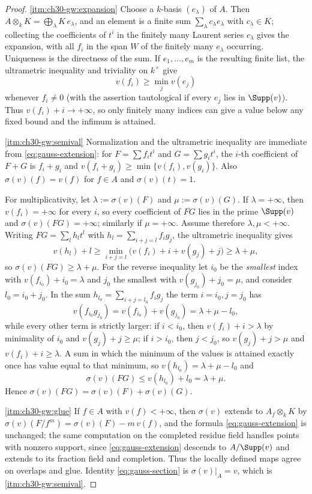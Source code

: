 \begin{proof}
\cref{itm:ch30-gw:expansion}  Choose a $k$-basis $(e_\lambda)$ of $A$.
Then $A\otimes_kK=\bigoplus_\lambda K\,e_\lambda$, and an element is a
finite sum $\sum_\lambda c_\lambda e_\lambda$ with
$c_\lambda\in K$; collecting the coefficients of $t^i$ in the finitely
many Laurent series $c_\lambda$ gives the expansion, with all $f_i$ in
the span $W$ of the finitely many $e_\lambda$ occurring.  Uniqueness is
the directness of the sum.  If $e_1,\ldots,e_m$ is the resulting finite
list, the ultrametric inequality and triviality on $k^\times$ give
\[
 v(f_i)\geq \min_jv(e_j)
\]
whenever $f_i\neq0$ (with the assertion tautological if every $e_j$ lies
in $\Supp(v)$).  Thus $v(f_i)+i\to+\infty$, so only finitely many indices
can give a value below any fixed bound and the infimum is attained.

\cref{itm:ch30-gw:semival}  Normalization and the ultrametric inequality are
immediate from \eqref{eq:gauss-extension}: for $F=\sum f_it^i$ and
$G=\sum g_it^i$, the $i$-th coefficient of $F+G$ is $f_i+g_i$ and
$v(f_i+g_i)\geq\min\{v(f_i),v(g_i)\}$.  Also
$\sigma(v)(f)=v(f)$ for $f\in A$ and $\sigma(v)(t)=1$.

For multiplicativity, let $\lambda:=\sigma(v)(F)$ and
$\mu:=\sigma(v)(G)$.  If $\lambda=+\infty$, then $v(f_i)=+\infty$ for
every $i$, so every coefficient of $FG$ lies in the prime
$\Supp(v)$ and $\sigma(v)(FG)=+\infty$; similarly if
$\mu=+\infty$.  Assume therefore $\lambda,\mu<+\infty$.  Writing
$FG=\sum_lh_lt^l$ with $h_l=\sum_{i+j=l}f_ig_j$, the ultrametric
inequality gives
\[
 v(h_l)+l\geq\min_{i+j=l}\bigl(v(f_i)+i+v(g_j)+j\bigr)\geq\lambda+\mu,
\]
so $\sigma(v)(FG)\geq\lambda+\mu$.  For the reverse inequality let
$i_0$ be the \emph{smallest} index with $v(f_{i_0})+i_0=\lambda$ and
$j_0$ the smallest with $v(g_{j_0})+j_0=\mu$, and consider
$l_0=i_0+j_0$.  In the sum $h_{l_0}=\sum_{i+j=l_0}f_ig_j$ the term
$i=i_0,j=j_0$ has
\[
 v(f_{i_0}g_{j_0})=v(f_{i_0})+v(g_{j_0})=\lambda+\mu-l_0 ,
\]
while every other term is strictly larger: if $i<i_0$, then
$v(f_i)+i>\lambda$ by minimality of $i_0$ and $v(g_j)+j\geq\mu$; if
$i>i_0$, then $j<j_0$, so $v(g_j)+j>\mu$ and $v(f_i)+i\geq\lambda$.
A sum in which the minimum of the values is attained exactly once has value
equal to that minimum, so $v(h_{l_0})=\lambda+\mu-l_0$ and
\[
 \sigma(v)(FG)\leq v(h_{l_0})+l_0=\lambda+\mu .
\]
Hence $\sigma(v)(FG)=\sigma(v)(F)+\sigma(v)(G)$.

\cref{itm:ch30-gw:glue}  If $f\in A$ with $v(f)<+\infty$, then
$\sigma(v)$ extends to $A_f\otimes_kK$ by
$\sigma(v)(F/f^m)=\sigma(v)(F)-m\,v(f)$, and the formula
\eqref{eq:gauss-extension} is unchanged; the same computation on the
completed residue field handles points with nonzero support, since
\eqref{eq:gauss-extension} descends to $A/\Supp(v)$ and extends to its
fraction field and completion.  Thus the locally defined maps agree on
overlaps and glue.  Identity \eqref{eq:gauss-section} is
$\sigma(v)|_A=v$, which is
\cref{itm:ch30-gw:semival}.


\end{proof}
